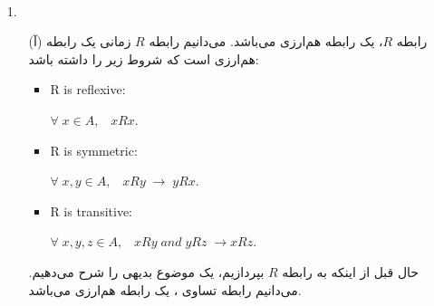 \\[0.1in]
\begin{enumerate}
    \item[1.]
    \begin{enumerate}
        \item[(آ)]
        رابطه $R$، یک رابطه هم‌ارزی
        می‌باشد. می‌دانیم رابطه $R$ زمانی یک رابطه هم‌ارزی است که شروط زیر را داشته باشد:
        \begin{latin}
        \begin{center}
            \begin{itemize}
                \item R is reflexive:\\
                    \begin{center}
                        $\forall \; x \in A, \;\;\; xRx.$
                    \end{center}
                \item R is symmetric:\\
                    \begin{center}
                        $\forall \; x,y \in A, \;\;\; 
                        xRy \; \rightarrow \; yRx.$
                    \end{center}
                \item R is transitive:\\
                    \begin{center}
                        $\forall \; x, y, z \in A,\;\;\; 
                        xRy \; \textit{and} \; yRz
                        \; \rightarrow xRz.$\\[0.15in]
                    \end{center}
            \end{itemize}
        \end{center}
        \end{latin}
        \newpage
        حال قبل از اینکه به رابطه $R$ بپردازیم، یک موضوع بدیهی را شرح می‌دهیم.
        می‌دانیم رابطه تساوی
        ، یک رابطه هم‌ارزی می‌باشد.\\
        \begin{latin}
            \centering
\end{latin}
\end{enumerate}
\end{enumerate}
